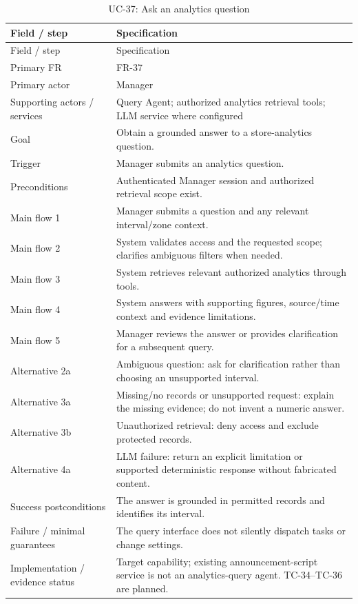 \begin{longtable}{P{0.23\textwidth}P{0.67\textwidth}}
\caption{UC-37: Ask an analytics question}\\
\toprule
Field / step & Specification\\
\midrule
\endfirsthead
\toprule
Field / step & Specification\\
\midrule
\endhead
Primary FR & FR-37\\
Primary actor & Manager\\
Supporting actors / services & Query Agent; authorized analytics retrieval tools; LLM service where configured\\
Goal & Obtain a grounded answer to a store-analytics question.\\
Trigger & Manager submits an analytics question.\\
Preconditions & Authenticated Manager session and authorized retrieval scope exist.\\
Main flow 1 & Manager submits a question and any relevant interval/zone context.\\
Main flow 2 & System validates access and the requested scope; clarifies ambiguous filters when needed.\\
Main flow 3 & System retrieves relevant authorized analytics through tools.\\
Main flow 4 & System answers with supporting figures, source/time context and evidence limitations.\\
Main flow 5 & Manager reviews the answer or provides clarification for a subsequent query.\\
Alternative 2a & Ambiguous question: ask for clarification rather than choosing an unsupported interval.\\
Alternative 3a & Missing/no records or unsupported request: explain the missing evidence; do not invent a numeric answer.\\
Alternative 3b & Unauthorized retrieval: deny access and exclude protected records.\\
Alternative 4a & LLM failure: return an explicit limitation or supported deterministic response without fabricated content.\\
Success postconditions & The answer is grounded in permitted records and identifies its interval.\\
Failure / minimal guarantees & The query interface does not silently dispatch tasks or change settings.\\
Implementation / evidence status & Target capability; existing announcement-script service is not an analytics-query agent. TC-34--TC-36 are planned.\\
\bottomrule
\end{longtable}
